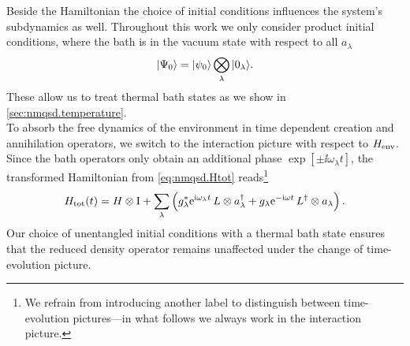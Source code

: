 Beside the Hamiltonian the choice of initial conditions influences the system's subdynamics as well.
Throughout this work we only consider product initial conditions, where the bath is in the vacuum state with respect to all $a_\lambda$
\begin{equation}
  | \Psi_0 \rangle = | \psi_0 \rangle \bigotimes\limits_\lambda | 0_\lambda \rangle.
  \label{eq:nmqsd.initial_conditions}
\end{equation}
These allow us to treat thermal bath states as we show in \autoref{sec:nmqsd.temperature}.\\

To absorb the free dynamics of the environment in time dependent creation and annihilation operators, we switch to the interaction picture with respect to $H_\mathrm{env}$.
Since the bath operators only obtain an additional phase $\exp[\pm \ii \omega_\lambda t]$, the transformed Hamiltonian from \autoref{eq:nmqsd.Htot} reads\footnote{We refrain from introducing another label to distinguish between time-evolution pictures---in what follows we always work in the interaction picture.}
\begin{equation}
  \Htot(t) = \Hsys \otimes \unit  +  \sum_\lambda \left( \cc{g}_\lambda \exp[\ii \omega_\lambda t] \, L \otimes \adj{a}_\lambda + g_\lambda \exp[-\ii \omega t] \, \adj{L} \otimes a_\lambda \right).
  \label{eq:nmqsd.Htot}
\end{equation}
Our choice of unentangled initial conditions with a thermal bath state ensures that the reduced density operator remains unaffected under the change of time-evolution picture.

